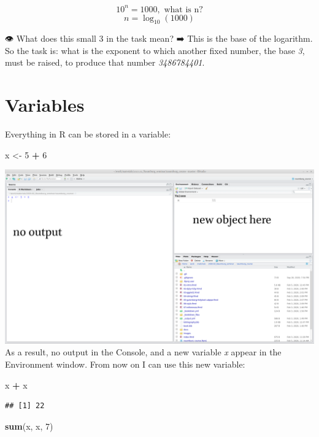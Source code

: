 \documentclass[
]{book}
\newenvironment{Shaded}{\begin{snugshade}}{\end{snugshade}}
\newcommand{\DecValTok}[1]{\textcolor[rgb]{0.00,0.00,0.81}{#1}}
\newcommand{\KeywordTok}[1]{\textcolor[rgb]{0.13,0.29,0.53}{\textbf{#1}}}
\newcommand{\NormalTok}[1]{#1}
\newcommand{\OperatorTok}[1]{\textcolor[rgb]{0.81,0.36,0.00}{\textbf{#1}}}
\newcommand{\StringTok}[1]{\textcolor[rgb]{0.31,0.60,0.02}{#1}}
\begin{document}
\[10^n = 1000,\text{ what is n?}\]
\[n = \log_{10}(1000)\]

👁 What does this small 3 in the task mean? ➡
This is the base of the logarithm. So the task is: what is the exponent to which another fixed number, the base \emph{3}, must be raised, to produce that number \emph{3486784401}.

\hypertarget{variables}{%
\section{Variables}\label{variables}}

Everything in R can be stored in a variable:

\begin{Shaded}
\begin{Highlighting}[]
\NormalTok{x <-}\StringTok{ }\DecValTok{5} \OperatorTok{+}\StringTok{ }\DecValTok{6}
\end{Highlighting}
\end{Shaded}

\includegraphics{images/01.04.variable.png}
As a result, no output in the Console, and a new variable \emph{x} appear in the Environment window. From now on I can use this new variable:

\begin{Shaded}
\begin{Highlighting}[]
\NormalTok{x }\OperatorTok{+}\StringTok{ }\NormalTok{x}
\end{Highlighting}
\end{Shaded}

\begin{verbatim}
## [1] 22
\end{verbatim}

\begin{Shaded}
\begin{Highlighting}[]
\KeywordTok{sum}\NormalTok{(x, x, }\DecValTok{7}\NormalTok{)}
\end{Highlighting}
\end{Shaded}
\end{document}
